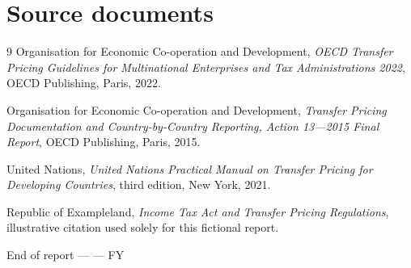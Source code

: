 \chapter{Source documents}
\begin{thebibliography}{9}
  Organisation for Economic Co-operation and Development,
  \emph{OECD Transfer Pricing Guidelines for Multinational Enterprises and Tax
  Administrations 2022}, OECD Publishing, Paris, 2022.

  Organisation for Economic Co-operation and Development,
  \emph{Transfer Pricing Documentation and Country-by-Country Reporting,
  Action 13---2015 Final Report}, OECD Publishing, Paris, 2015.

  United Nations,
  \emph{United Nations Practical Manual on Transfer Pricing for Developing
  Countries}, third edition, New York, 2021.

  Republic of Exampleland,
  \emph{Income Tax Act and Transfer Pricing Regulations}, illustrative citation
  used solely for this fictional report.
\end{thebibliography}

\vfill
\begin{center}
  \color{Slate}\small
  End of report --- \EntityName{} --- FY\ReportYear
\end{center}
